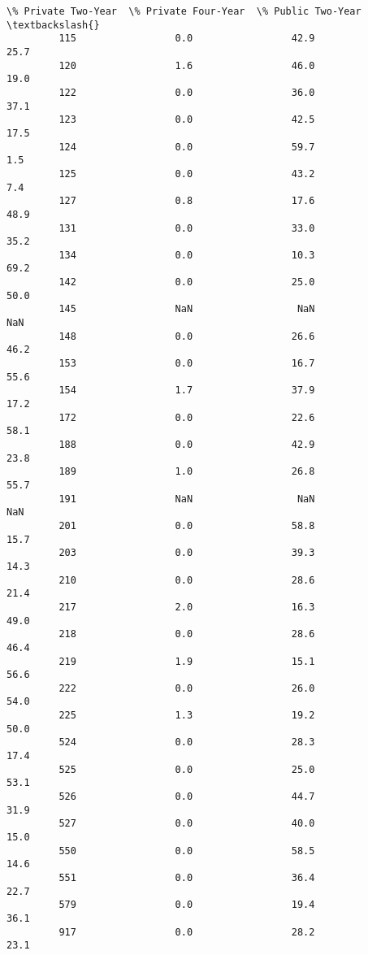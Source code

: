 \documentclass[11pt]{article}
\begin{document}
\begin{Verbatim}[commandchars=\\\{\}]
              \% Private Two-Year  \% Private Four-Year  \% Public Two-Year  \textbackslash{}
         115                 0.0                 42.9               25.7   
         120                 1.6                 46.0               19.0   
         122                 0.0                 36.0               37.1   
         123                 0.0                 42.5               17.5   
         124                 0.0                 59.7                1.5   
         125                 0.0                 43.2                7.4   
         127                 0.8                 17.6               48.9   
         131                 0.0                 33.0               35.2   
         134                 0.0                 10.3               69.2   
         142                 0.0                 25.0               50.0   
         145                 NaN                  NaN                NaN   
         148                 0.0                 26.6               46.2   
         153                 0.0                 16.7               55.6   
         154                 1.7                 37.9               17.2   
         172                 0.0                 22.6               58.1   
         188                 0.0                 42.9               23.8   
         189                 1.0                 26.8               55.7   
         191                 NaN                  NaN                NaN   
         201                 0.0                 58.8               15.7   
         203                 0.0                 39.3               14.3   
         210                 0.0                 28.6               21.4   
         217                 2.0                 16.3               49.0   
         218                 0.0                 28.6               46.4   
         219                 1.9                 15.1               56.6   
         222                 0.0                 26.0               54.0   
         225                 1.3                 19.2               50.0   
         524                 0.0                 28.3               17.4   
         525                 0.0                 25.0               53.1   
         526                 0.0                 44.7               31.9   
         527                 0.0                 40.0               15.0   
         550                 0.0                 58.5               14.6   
         551                 0.0                 36.4               22.7   
         579                 0.0                 19.4               36.1   
         917                 0.0                 28.2               23.1   
         

\end{Verbatim}
\end{document}
